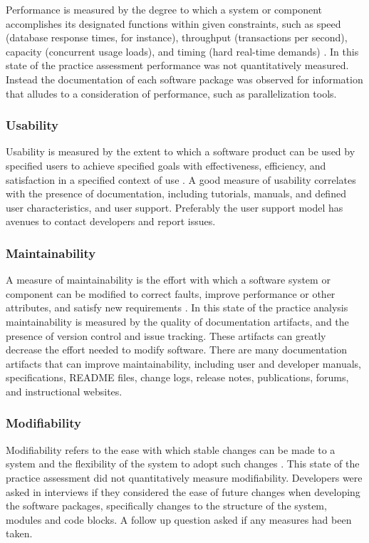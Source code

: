 \documentclass[12pt, notitlepage]{article}
\begin{document}
Performance is measured by the degree to which a system or component accomplishes its designated functions within given constraints, such as speed (database response times, for instance), throughput (transactions per second), capacity (concurrent usage loads), and timing (hard real-time demands) \citep{IEEEStdGlossarySET1990} \citep{wiegers2003softreq}. In this state of the practice assessment performance was not quantitatively measured. Instead the documentation of each software package was observed for information that alludes to a consideration of performance, such as parallelization tools. 

\subsubsection{Usability}

Usability is measured by the extent to which a software product can be used by specified users to achieve specified goals with effectiveness, efficiency, and satisfaction in a specified context of use \citep{nielsonusability}. A good measure of usability correlates with the presence of documentation, including tutorials, manuals, and defined user characteristics, and user support. Preferably the user support model has avenues to contact developers and report issues.

\subsubsection{Maintainability}

A measure of maintainability is the effort with which a software
system or component can be modified to correct faults, improve performance or other attributes, and satisfy new requirements \citep{IEEEStdGlossarySET1990} \citep{boehm2007software}. In this state of the practice analysis maintainability is measured by the quality of documentation artifacts, and the presence of version control and issue tracking. These artifacts can greatly decrease the effort needed to modify software. There are many documentation artifacts that can improve maintainability, including user and developer manuals, specifications, README files, change logs, release notes, publications, forums, and instructional websites. 

\subsubsection{Modifiability}

Modifiability refers to the ease with which stable changes can be made to a system and the flexibility of the system to adopt such changes \citep{8016712}.
This state of the practice assessment did not quantitatively measure modifiability. Developers were asked in interviews if they considered the ease of future changes when developing the software packages, specifically changes to the structure of the system, modules and code blocks. A follow up question asked if any measures had been taken.
\end{document}

